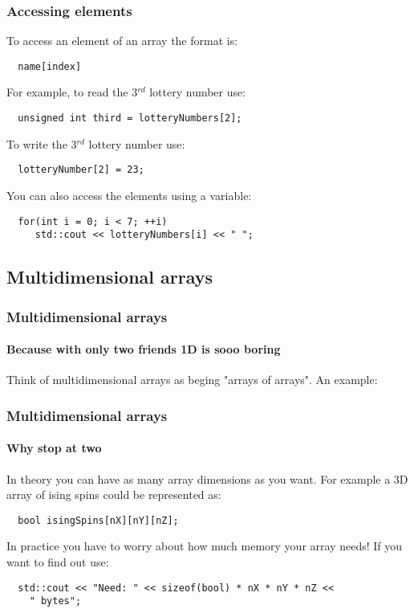 \documentclass{beamer}
\begin{document}
\begin{frame}[fragile]
  \frametitle{Accessing elements}
  
  To access an element of an array the format is:
  \begin{lstlisting}
  name[index]
  \end{lstlisting}
  \pause
  For example, to read the 3$^{rd}$ lottery number use:
  \begin{lstlisting}
  unsigned int third = lotteryNumbers[2];
  \end{lstlisting}
  \pause
  To write the 3$^{rd}$ lottery number use:
  \begin{lstlisting}
  lotteryNumber[2] = 23;
  \end{lstlisting}
  \pause
  You can also access the elements using a variable:
  \begin{lstlisting}
  for(int i = 0; i < 7; ++i)
     std::cout << lotteryNumbers[i] << " ";
  \end{lstlisting}
\end{frame}

\subsection{Multidimensional arrays}

\begin{frame}[fragile]
  \frametitle{Multidimensional arrays}
  \framesubtitle{Because with only two friends 1D is sooo boring}
  Think of multidimensional arrays as beging "arrays of arrays".  An example:
    
  

\end{frame}

\begin{frame}[fragile]
  \frametitle{Multidimensional arrays}
  \framesubtitle{Why stop at two}
  In theory you can have as many array dimensions as you want.  For example a 3D array of ising spins could be represented as:
  \begin{lstlisting}
  bool isingSpins[nX][nY][nZ];
  \end{lstlisting}
  In practice you have to worry about how much memory your array needs!\pause{}  If you want to find out use:
  \begin{lstlisting}
  std::cout << "Need: " << sizeof(bool) * nX * nY * nZ <<
    " bytes";
  \end{lstlisting}

\end{frame}
\end{document}

